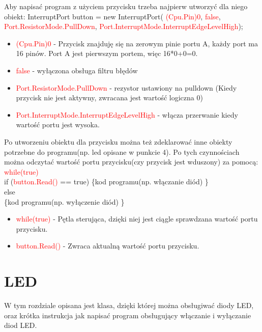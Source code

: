 \documentclass{article}
\begin{document}
Aby napisać program z użyciem przycisku trzeba najpierw utworzyć dla niego obiekt:\newline \newline
InterruptPort button = 
new InterruptPort(\space \textcolor{red}{ (Cpu.Pin)0}, \space \textcolor{red}{ false},\space \textcolor{red}{ Port.ResistorMode.PullDown}, \space \textcolor{red}{ Port.InterruptMode.InterruptEdgeLevelHigh});
\begin{itemize}
\item \textcolor{red}{(Cpu.Pin)0} - Przycisk znajduję się na zerowym pinie portu A, każdy port ma 16 pinów. Port A jest pierwszym portem, więc 16*0+0=0.
\item \textcolor{red}{false} - wyłączona obsługa filtru błędów
\item \textcolor{red}{Port.ResistorMode.PullDown} - rezystor ustawiony na pulldown (Kiedy przycisk nie jest aktywny, zwracana jest wartość logiczna 0)
\item \textcolor{red}{Port.InterruptMode.InterruptEdgeLevelHigh} - włącza przerwanie kiedy wartość portu jest wysoka.
\end{itemize}
Po utworzeniu obiektu dla przycisku można też zdeklarować inne obiekty potrzebne do programu(np. led opisane w punkcie 4). Po tych czynnościach można odczytać wartość portu przycisku(czy przycisk jest wduszony) za pomocą:\newline\\
\textcolor{red}{while(true)}\\
 if (\textcolor{red}{button.Read()} == true)\newline
 \{kod programu(np. włączanie diód) \}\\
 else\\
 \{kod programu(np. wyłączenie diód) \}\\
 
 \begin{itemize}
\item \textcolor{red}{while(true)} - Pętla sterująca, dzięki niej jest ciągle sprawdzana wartość portu przycisku.
\item \textcolor{red}{button.Read()} - Zwraca aktualną wartość portu przycisku.
\end{itemize}
 
 
\section{LED}
W tym rozdziale opisana jest klasa, dzięki której można obsługiwać diody LED, oraz krótka instrukcja jak napisać program obsługujący włączanie i wyłączanie diod LED.
\end{document}
